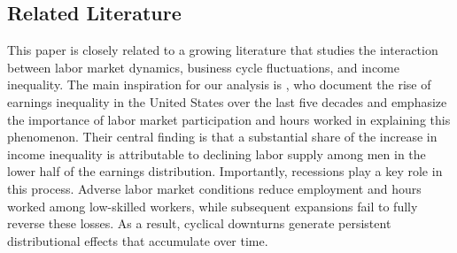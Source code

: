 \documentclass[12pt]{article}
\newcommand{\citeonline}[1]{\citet{#1}}
\begin{document}
	
	
	
	
	
	
	
	
	\subsection{Related Literature}
	
	
	This paper is closely related to a growing literature that studies the interaction between labor market dynamics, business cycle fluctuations, and income inequality. The main inspiration for our analysis is \citeonline{heathcote2020rise}, who document the rise of earnings inequality in the United States over the last five decades and emphasize the importance of labor market participation and hours worked in explaining this phenomenon. Their central finding is that a substantial share of the increase in income inequality is attributable to declining labor supply among men in the lower half of the earnings distribution. Importantly, recessions play a key role in this process. Adverse labor market conditions reduce employment and hours worked among low-skilled workers, while subsequent expansions fail to fully reverse these losses. As a result, cyclical downturns generate persistent distributional effects that accumulate over time.
	
\end{document}
